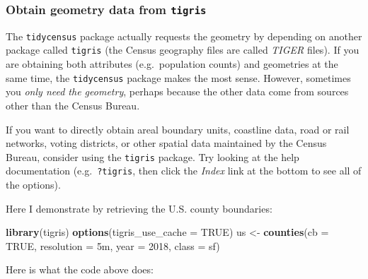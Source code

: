 \documentclass[
]{book}
\newenvironment{Shaded}{\begin{snugshade}}{\end{snugshade}}
\newcommand{\AttributeTok}[1]{\textcolor[rgb]{0.13,0.29,0.53}{#1}}
\newcommand{\ConstantTok}[1]{\textcolor[rgb]{0.56,0.35,0.01}{#1}}
\newcommand{\DecValTok}[1]{\textcolor[rgb]{0.00,0.00,0.81}{#1}}
\newcommand{\FunctionTok}[1]{\textcolor[rgb]{0.13,0.29,0.53}{\textbf{#1}}}
\newcommand{\NormalTok}[1]{#1}
\newcommand{\OtherTok}[1]{\textcolor[rgb]{0.56,0.35,0.01}{#1}}
\newcommand{\StringTok}[1]{\textcolor[rgb]{0.31,0.60,0.02}{#1}}
\begin{document}
\hypertarget{obtain-geometry-data-from-tigris}{%
\subsubsection{\texorpdfstring{Obtain geometry data from \texttt{tigris}}{Obtain geometry data from tigris}}\label{obtain-geometry-data-from-tigris}}

The \texttt{tidycensus} package actually requests the geometry by depending on another package called \texttt{tigris} (the Census geography files are called \emph{TIGER} files). If you are obtaining both attributes (e.g.~population counts) and geometries at the same time, the \texttt{tidycensus} package makes the most sense. However, sometimes you \emph{only need the geometry}, perhaps because the other data come from sources other than the Census Bureau.

If you want to directly obtain areal boundary units, coastline data, road or rail networks, voting districts, or other spatial data maintained by the Census Bureau, consider using the \texttt{tigris} package. Try looking at the help documentation (e.g.~\texttt{?tigris}, then click the \emph{Index} link at the bottom to see all of the options).

Here I demonstrate by retrieving the U.S. county boundaries:

\begin{Shaded}
\begin{Highlighting}[]
\FunctionTok{library}\NormalTok{(tigris)}
\FunctionTok{options}\NormalTok{(}\AttributeTok{tigris\_use\_cache =} \ConstantTok{TRUE}\NormalTok{)}
\NormalTok{us }\OtherTok{\textless{}{-}} \FunctionTok{counties}\NormalTok{(}\AttributeTok{cb =} \ConstantTok{TRUE}\NormalTok{,}
                        \AttributeTok{resolution =} \StringTok{\textquotesingle{}5m\textquotesingle{}}\NormalTok{, }
                        \AttributeTok{year =} \DecValTok{2018}\NormalTok{,}
                        \AttributeTok{class =} \StringTok{\textquotesingle{}sf\textquotesingle{}}\NormalTok{)}
\end{Highlighting}
\end{Shaded}

Here is what the code above does:
\end{document}
